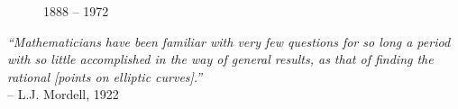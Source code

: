 {\begin{frame}[plain]
\begin{minipage}{0.18\textwidth}
\begin{figure}[h]
	 \par
	{\small 1888 -- 1972}
	\end{figure}
	\end{minipage} \hspace{0.2cm} \begin{minipage}{0.76\textwidth}
	\begin{center} \phantom{.} \par \phantom{.} \par
	{\itshape ``Mathematicians have been familiar with very few questions for so long a period with so little accomplished in the way of general results, as that of finding the rational [points on elliptic curves].''} \\
	 \phantom{x}\hfill-- L.J. Mordell, 1922
	\end{center}
 	\end{minipage}
\end{frame}
}